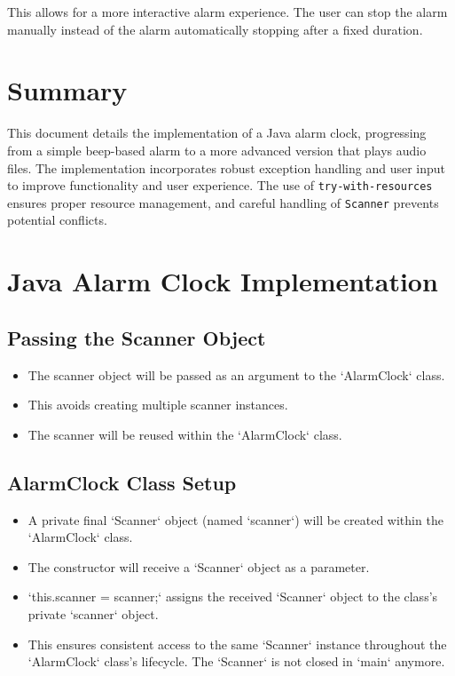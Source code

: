 \documentclass{article}
\begin{document}
\begin{itemize}
This allows for a more interactive alarm experience.  The user can stop the alarm manually instead of the alarm automatically stopping after a fixed duration.


\section{Summary}

This document details the implementation of a Java alarm clock, progressing from a simple beep-based alarm to a more advanced version that plays audio files.  The implementation incorporates robust exception handling and user input to improve functionality and user experience.  The use of \texttt{try-with-resources} ensures proper resource management, and careful handling of \texttt{Scanner} prevents potential conflicts.


\section{Java Alarm Clock Implementation}

\subsection{Passing the Scanner Object}

\begin{itemize}
    \item The scanner object will be passed as an argument to the `AlarmClock` class.
    \item This avoids creating multiple scanner instances.
    \item The scanner will be reused within the `AlarmClock` class.
\end{itemize}

\subsection{AlarmClock Class Setup}

\begin{itemize}
    \item A private final `Scanner` object (named `scanner`) will be created within the `AlarmClock` class.
    \item The constructor will receive a `Scanner` object as a parameter.
    \item  `this.scanner = scanner;` assigns the received `Scanner` object to the class's private `scanner` object.
    \item This ensures consistent access to the same `Scanner` instance throughout the `AlarmClock` class's lifecycle.  The `Scanner` is not closed in `main` anymore.
\end{itemize}



\end{itemize}
\end{document}
